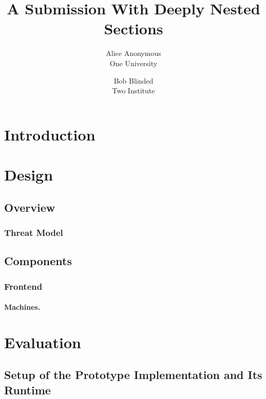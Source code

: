 \documentclass[letterpaper,twocolumn,10pt]{article}
\date{}
\title{\Large \bf A Submission With Deeply Nested Sections}
\author{{\rm Alice Anonymous}\\One University \and {\rm Bob Blinded}\\Two Institute}
\begin{document}
\maketitle

\begin{abstract}
\lipsum[1][1-5]
\end{abstract}

\section{Introduction}
\lipsum[2-4]

\section{Design}
\subsection{Overview}
\subsubsection{Threat Model}
\lipsum[5]

\subsection{Components}
\subsubsection{Frontend}
\paragraph{Machines.}
\lipsum[6]

\section{Evaluation}
\subsection{Setup of the Prototype Implementation and Its Runtime}
\end{document}
